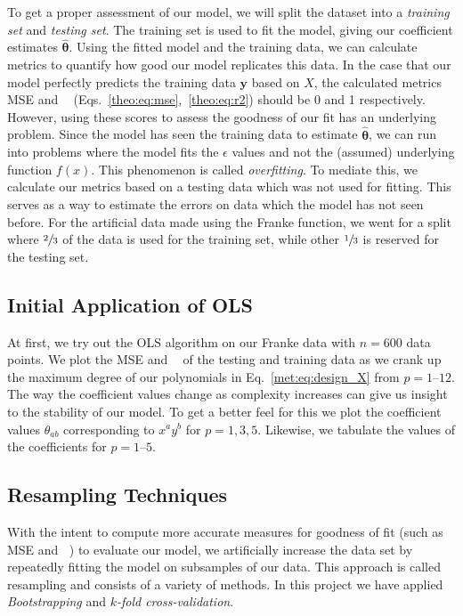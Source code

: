 \documentclass[twocolumn,english,notitlepage]{article}
\renewcommand{\vec}[1]{\boldsymbol{#1}}
\DeclareMathOperator{\Rsquared}{R^2}
\begin{document}
            To get a proper assessment of our model, we will split the dataset into a \textit{training set} and \textit{testing set}. The training set is used to fit the model, giving our coefficient estimates $\vec{\hat{\theta}}$. Using the fitted model and the training data, we can calculate metrics to quantify how good our model replicates this data. In the case that our model perfectly predicts the training data $\vec{y}$ based on $X$, the calculated metrics MSE and $\Rsquared$ (Eqs.~\ref{theo:eq:mse},~\ref{theo:eq:r2}) should be 0 and 1 respectively. However, using these scores to assess the goodness of our fit has an underlying problem. Since the model has seen the training data to estimate $\vec{\hat{\theta}}$, we can run into problems where the model fits the $\epsilon$ values and not the (assumed) underlying function $f(x)$. This phenomenon is called \textit{overfitting}. To mediate this, we calculate our metrics based on a testing data which was not used for fitting. This serves as a way to estimate the errors on data which the model has not seen before. For the artificial data made using the Franke function, we went for a split where $\sfrac{2}{3}$ of the data is used for the training set, while other $\sfrac{1}{3}$ is reserved for the testing set.


    \subsection{Initial Application of OLS}
        At first, we try out the OLS algorithm on our Franke data with $n=600$ data points. We plot the MSE and $\Rsquared$ of the testing and training data as we crank up the maximum degree of our polynomials in Eq.~\eqref{met:eq:design_X} from $p=1 \text{--} 12$. The way the coefficient values change as complexity increases can give us insight to the stability of our model. To get a better feel for this we plot the coefficient values $\theta_{ab}$ corresponding to $x^ay^b$ for $p=1,3,5$. Likewise, we tabulate the values of the coefficients for $p=1 \text{--} 5$. 

    \subsection{Resampling Techniques}
        With the intent to compute more accurate measures for goodness of fit (such as MSE and $\Rsquared$) to evaluate our model, we 
        artificially increase the data set by repeatedly fitting the model on subsamples of our data. This approach is called resampling and consists of a variety of methods. In this project we have applied \textit{Bootstrapping} and \textit{$k$-fold cross-validation}. 
\end{document}
